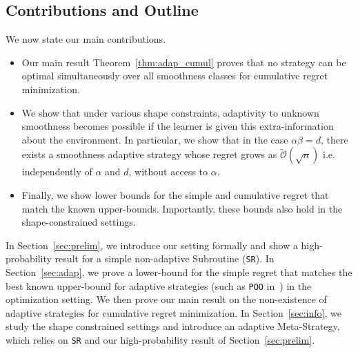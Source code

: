 \documentclass[final,12pt]{colt2018}
\newcommand{\tildeO}[1]{\tilde{\mathcal O}\left( #1 \right)}
\begin{document}
\subsection{Contributions and Outline}
We now state our main contributions.
\begin{itemize}
\item Our main result Theorem~\ref{thm:adap_cumul} proves that no strategy can be optimal simultaneously over all smoothness classes for cumulative regret minimization.
\item We show that under various shape constraints, adaptivity to unknown smoothness becomes possible if the learner is given this extra-information about the environment. In particular, we show that in the case $\alpha\beta = d$, there exists a smoothness adaptive strategy whose regret grows as $\tildeO{\sqrt{n}}$ i.e. independently of $\alpha$ and $d$, without access to $\alpha$.
\item Finally, we show lower bounds for the simple and cumulative regret that match the known upper-bounds. Importantly, these bounds also hold in the shape-constrained settings.
\end{itemize}

In Section~\ref{sec:prelim}, we introduce our setting formally and show a high-probability result for a simple non-adaptive Subroutine (\texttt{SR}). In Section~\ref{sec:adap}, we prove a lower-bound for the simple regret that matches the best known upper-bound for adaptive strategies (such as \texttt{POO} in~\cite{grill2015black}) in the optimization setting. We then prove our main result on the non-existence of adaptive strategies for cumulative regret minimization. In Section~\ref{sec:info}, we study the shape constrained settings and introduce an adaptive Meta-Strategy, which relies on \texttt{SR} and our high-probability result of Section~\ref{sec:prelim}.
\end{document}

